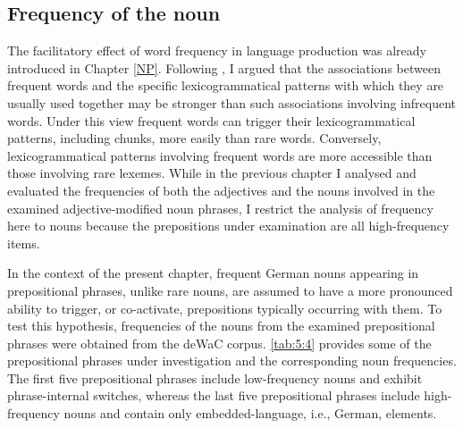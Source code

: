 \subsection{Frequency of the noun}

The facilitatory effect of word frequency in language production was already introduced in Chapter \ref{NP}. Following \citep[115]{macwhinney1997}, I argued that the associations between frequent words and the specific lexicogrammatical patterns with which they are usually used together may be stronger than such associations involving infrequent words. Under this view frequent words can trigger their lexicogrammatical patterns, including chunks, more easily than rare words. Conversely, lexicogrammatical patterns involving frequent words are more accessible than those involving rare lexemes. While in the previous chapter I analysed and evaluated the frequencies of both the adjectives and the nouns involved in the examined adjective-modified noun phrases, I restrict the analysis of frequency here to nouns because the prepositions under examination are all high-frequency items. 

In the context of the present chapter, frequent German nouns appearing in prepositional phrases, unlike rare nouns, are assumed to have a more pronounced ability to trigger, or co-activate, prepositions typically occurring with them. To test this hypothesis, frequencies of the nouns from the examined prepositional phrases were obtained from the deWaC corpus. \ref{tab:5:4} provides some of the prepositional phrases under investigation and the corresponding noun frequencies. The first five prepositional phrases include low-frequency nouns and exhibit phrase-internal switches, whereas the last five prepositional phrases include high-frequency nouns and contain only embedded-language, i.e., German, elements.

